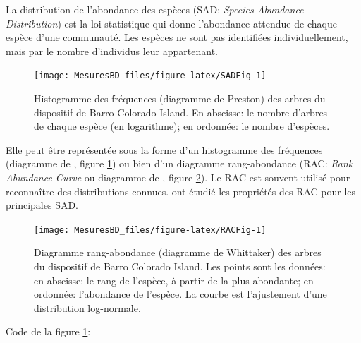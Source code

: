 \documentclass[
  11pt,
  american,
  a4paper,
  extrafontsizes,onecolumn,openright
  ]{memoir}
\begin{document}
La distribution de l'abondance des espèces (SAD: \emph{Species Abundance Distribution}) est la loi statistique qui donne l'abondance attendue de chaque espèce d'une communauté.
Les espèces ne sont pas identifiées individuellement, mais par le nombre d'individus leur appartenant.



\scriptsize

\begin{figure}

{\centering \texttt{[image: MesuresBD\_files/figure-latex/SADFig-1]} 

}

\caption{Histogramme des fréquences (diagramme de Preston) des arbres du dispositif de Barro Colorado Island. En abscisse: le nombre d'arbres de chaque espèce (en logarithme); en ordonnée: le nombre d'espèces.}\label{fig:SADFig}
\end{figure}

\normalsize

Elle peut être représentée sous la forme d'un histogramme des fréquences (diagramme de \textcite{Preston1948}, figure \ref{fig:SADFig}) ou bien d'un diagramme rang-abondance (RAC: \emph{Rank Abundance Curve} ou diagramme de \textcite{Whittaker1965}, figure \ref{fig:RACFig}).
Le RAC est souvent utilisé pour reconnaître des distributions connues.
\textcite{Izsak2012} ont étudié les propriétés des RAC pour les principales SAD.



\scriptsize

\begin{figure}

{\centering \texttt{[image: MesuresBD\_files/figure-latex/RACFig-1]} 

}

\caption{Diagramme rang-abondance (diagramme de Whittaker) des arbres du dispositif de Barro Colorado Island. Les points sont les données: en abscisse: le rang de l'espèce, à partir de la plus abondante; en ordonnée: l'abondance de l'espèce. La courbe est l'ajustement d'une distribution log-normale.}\label{fig:RACFig}
\end{figure}

\normalsize

Code de la figure \ref{fig:SADFig}:

\scriptsize
\end{document}
